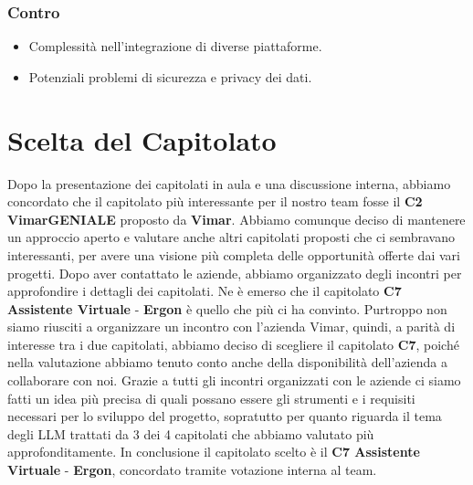\documentclass{article}
\begin{document}
\subsubsection{Contro}
\begin{itemize}
    \item Complessità nell'integrazione di diverse piattaforme.
    \item Potenziali problemi di sicurezza e privacy dei dati.
\end{itemize}

\section{Scelta del Capitolato}

Dopo la presentazione dei capitolati in aula e una discussione interna, abbiamo concordato che 
il capitolato più interessante per il nostro team fosse il \textbf{C2 VimarGENIALE} proposto da \textbf{Vimar}.
Abbiamo comunque deciso di mantenere un approccio aperto e valutare anche altri capitolati proposti che
ci sembravano interessanti, per avere una visione più completa delle opportunità offerte dai vari progetti.
Dopo aver contattato le aziende, abbiamo organizzato degli incontri per approfondire i dettagli dei capitolati. 
Ne è emerso che il capitolato \textbf{C7 Assistente Virtuale} - \textbf{Ergon} è quello che più ci ha convinto.
Purtroppo non siamo riusciti a organizzare un incontro con l'azienda Vimar, quindi, a parità di interesse
tra i due capitolati, abbiamo deciso di scegliere il capitolato \textbf{C7}, poiché nella valutazione abbiamo 
tenuto conto anche della disponibilità dell'azienda a collaborare con noi.
Grazie a tutti gli incontri organizzati con le aziende ci siamo fatti un idea più precisa di quali possano
essere gli strumenti e i requisiti necessari per lo sviluppo del progetto, sopratutto per quanto riguarda
il tema degli LLM trattati da 3 dei 4 capitolati che abbiamo valutato più approfonditamente.
In conclusione il capitolato scelto è il \textbf{C7 Assistente Virtuale} - \textbf{Ergon}, 
concordato tramite votazione interna al team.
\end{document}
